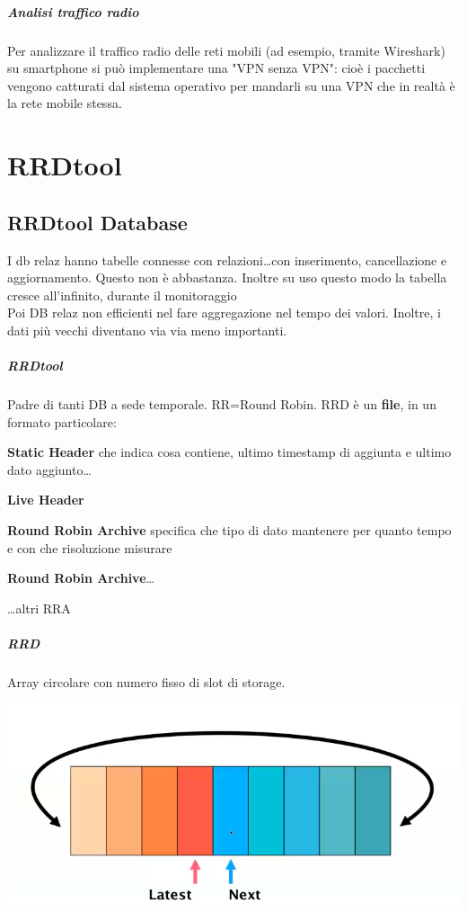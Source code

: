 \documentclass[10pt]{book}
\begin{document}
\paragraph{Analisi traffico radio} Per analizzare il traffico radio delle reti mobili (ad esempio, tramite Wireshark) su smartphone si può implementare una "VPN senza VPN": cioè i pacchetti vengono catturati dal sistema operativo per mandarli su una VPN che in realtà è la rete mobile stessa.
\chapter{RRDtool}
\section{RRDtool Database}
I db relaz hanno tabelle connesse con relazioni\ldots con inserimento, cancellazione e aggiornamento. Questo non è abbastanza. Inoltre su uso questo modo la tabella cresce all'infinito, durante il monitoraggio\\
Poi DB relaz non efficienti nel fare aggregazione nel tempo dei valori. Inoltre, i dati più vecchi diventano via via meno importanti.
\paragraph{RRDtool} Padre di tanti DB a sede temporale. RR=Round Robin. RRD è un \textbf{file}, in un formato particolare:
\begin{list}{}{}
	\item \textbf{Static Header} che indica cosa contiene, ultimo timestamp di aggiunta e ultimo dato aggiunto\ldots
	\item \textbf{Live Header} 
	\item \textbf{Round Robin Archive} specifica che tipo di dato mantenere per quanto tempo e con che risoluzione misurare
	\item \textbf{Round Robin Archive}\ldots
	\item \ldots altri RRA
\end{list}
\paragraph{RRD} Array circolare con numero fisso di slot di storage.
\begin{center}
	\includegraphics[scale=0.7]{rrdtool_rr.png}
\end{center}
\end{document}
